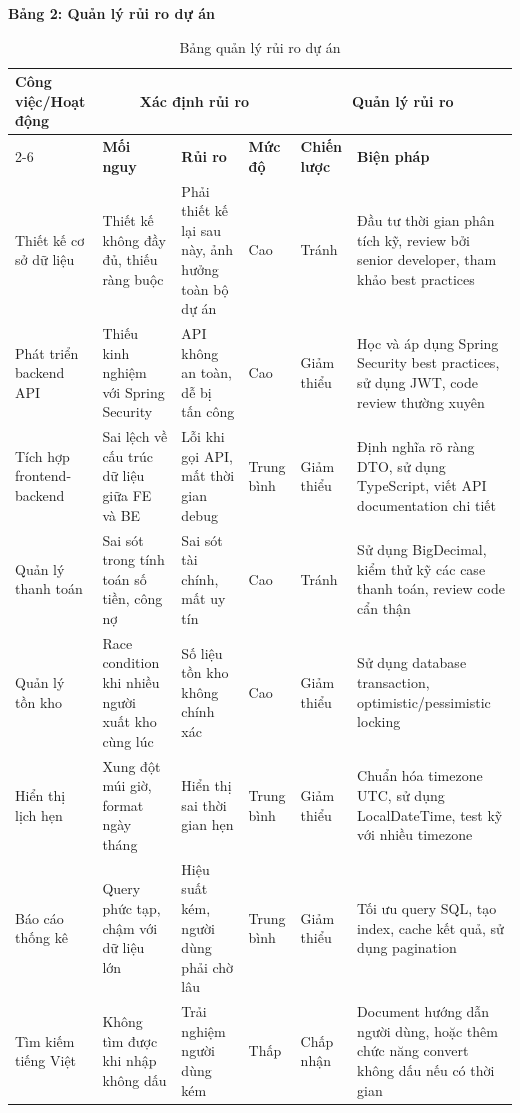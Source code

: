 \vspace{1em}

\textbf{Bảng 2: Quản lý rủi ro dự án}

\begin{table}[h]
\centering
\caption{Bảng quản lý rủi ro dự án}
\scriptsize
\begin{tabular}{|p{2.5cm}|p{2.5cm}|p{2cm}|p{1.8cm}|p{1.8cm}|p{2.5cm}|}
\hline
\textbf{Công việc/Hoạt động} & \multicolumn{3}{c|}{\textbf{Xác định rủi ro}} & \multicolumn{2}{c|}{\textbf{Quản lý rủi ro}} \\
\cline{2-6}
 & \textbf{Mối nguy} & \textbf{Rủi ro} & \textbf{Mức độ} & \textbf{Chiến lược} & \textbf{Biện pháp} \\
\hline
Thiết kế cơ sở dữ liệu & Thiết kế không đầy đủ, thiếu ràng buộc & Phải thiết kế lại sau này, ảnh hưởng toàn bộ dự án & Cao & Tránh & Đầu tư thời gian phân tích kỹ, review bởi senior developer, tham khảo best practices \\
\hline
Phát triển backend API & Thiếu kinh nghiệm với Spring Security & API không an toàn, dễ bị tấn công & Cao & Giảm thiểu & Học và áp dụng Spring Security best practices, sử dụng JWT, code review thường xuyên \\
\hline
Tích hợp frontend-backend & Sai lệch về cấu trúc dữ liệu giữa FE và BE & Lỗi khi gọi API, mất thời gian debug & Trung bình & Giảm thiểu & Định nghĩa rõ ràng DTO, sử dụng TypeScript, viết API documentation chi tiết \\
\hline
Quản lý thanh toán & Sai sót trong tính toán số tiền, công nợ & Sai sót tài chính, mất uy tín & Cao & Tránh & Sử dụng BigDecimal, kiểm thử kỹ các case thanh toán, review code cẩn thận \\
\hline
Quản lý tồn kho & Race condition khi nhiều người xuất kho cùng lúc & Số liệu tồn kho không chính xác & Cao & Giảm thiểu & Sử dụng database transaction, optimistic/pessimistic locking \\
\hline
Hiển thị lịch hẹn & Xung đột múi giờ, format ngày tháng & Hiển thị sai thời gian hẹn & Trung bình & Giảm thiểu & Chuẩn hóa timezone UTC, sử dụng LocalDateTime, test kỹ với nhiều timezone \\
\hline
Báo cáo thống kê & Query phức tạp, chậm với dữ liệu lớn & Hiệu suất kém, người dùng phải chờ lâu & Trung bình & Giảm thiểu & Tối ưu query SQL, tạo index, cache kết quả, sử dụng pagination \\
\hline
Tìm kiếm tiếng Việt & Không tìm được khi nhập không dấu & Trải nghiệm người dùng kém & Thấp & Chấp nhận & Document hướng dẫn người dùng, hoặc thêm chức năng convert không dấu nếu có thời gian \\

\end{tabular}
\end{table}
